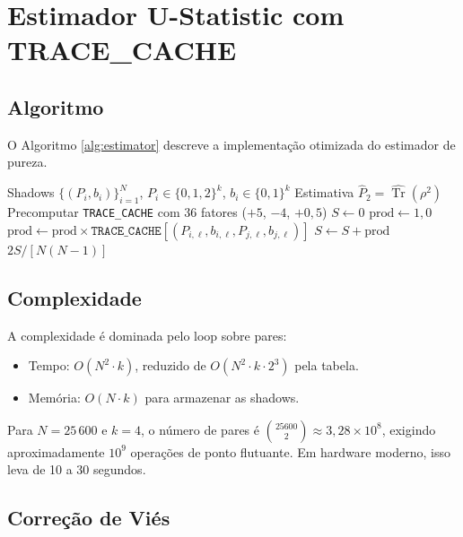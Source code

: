 \documentclass[12pt,a4paper,oneside]{book}
\theoremstyle{definition}
\theoremstyle{remark}
\DeclareMathOperator{\Tr}{Tr}
\begin{document}
\section{Estimador U-Statistic com TRACE\_CACHE}

\subsection{Algoritmo}

O Algoritmo \ref{alg:estimator} descreve a implementação otimizada do estimador de pureza.

\begin{algorithm}[H]
\caption{Estimador de Pureza com TRACE\_CACHE}\label{alg:estimator}
\begin{algorithmic}[1]
\Require Shadows $\{(P_i, b_i)\}_{i=1}^N$, $P_i \in \{0,1,2\}^k$, $b_i \in \{0,1\}^k$
\Ensure Estimativa $\widehat{P}_2 = \widehat{\Tr}(\rho^2)$
\State Precomputar \texttt{TRACE\_CACHE} com 36 fatores ($+5$, $-4$, $+0{,}5$)
\State $S \gets 0$
        \State $\text{prod} \gets 1{,}0$
            \State $\text{prod} \gets \text{prod} \times \texttt{TRACE\_CACHE}[(P_{i,\ell}, b_{i,\ell}, P_{j,\ell}, b_{j,\ell})]$
        \EndFor
        \State $S \gets S + \text{prod}$
    \EndFor
\EndFor
\State \Return $2S / [N(N-1)]$
\end{algorithmic}
\end{algorithm}

\subsection{Complexidade}

A complexidade é dominada pelo loop sobre pares:
\begin{itemize}
    \item Tempo: $O(N^2 \cdot k)$, reduzido de $O(N^2 \cdot k \cdot 2^3)$ pela tabela.
    \item Memória: $O(N \cdot k)$ para armazenar as shadows.
\end{itemize}

Para $N = 25\,600$ e $k = 4$, o número de pares é $\binom{25600}{2} \approx 3{,}28 \times 10^8$, exigindo aproximadamente $10^9$ operações de ponto flutuante. Em hardware moderno, isso leva de 10 a 30 segundos.

\subsection{Correção de Viés}
\end{document}
